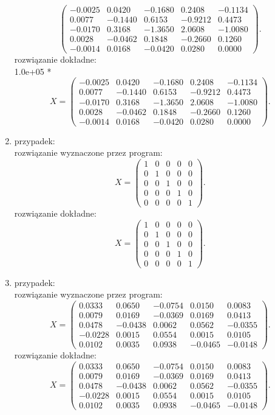 \documentclass[12pt]{article}
\begin{document}
\begin{enumerate}
\[\begin{pmatrix}
-0.0025 & 0.0420 & -0.1680 & 0.2408 & -0.1134 \\
0.0077 & -0.1440 & 0.6153 & -0.9212 & 0.4473 \\
-0.0170 & 0.3168 & -1.3650 & 2.0608 & -1.0080 \\
0.0028 & -0.0462 & 0.1848 & -0.2660 & 0.1260 \\
-0.0014 & 0.0168 & -0.0420 & 0.0280 & 0.0000
\end{pmatrix}.
\]
rozwi\k{a}zanie dok\l{}adne:
\\ 1.0e+05 *
\[ 
X=\begin{pmatrix}
-0.0025 & 0.0420 & -0.1680 & 0.2408 & -0.1134 \\
0.0077 & -0.1440 & 0.6153 & -0.9212 & 0.4473 \\
-0.0170 & 0.3168 & -1.3650 & 2.0608 & -1.0080 \\
0.0028 & -0.0462 & 0.1848 & -0.2660 & 0.1260 \\
-0.0014 & 0.0168 & -0.0420 & 0.0280 & 0.0000
\end{pmatrix}.
\]
\item przypadek:
\\
rozwi\k{a}zanie wyznaczone przez program:
\[
X=\begin{pmatrix}
1 & 0 & 0 & 0 & 0 \\
0 & 1 & 0 & 0 & 0 \\
0 & 0 & 1 & 0 & 0 \\
0 & 0 & 0 & 1 & 0 \\
0 & 0 & 0 & 0 & 1
\end{pmatrix}.
\]
rozwi\k{a}zanie dok\l{}adne:
\[
X=\begin{pmatrix}
1 & 0 & 0 & 0 & 0 \\
0 & 1 & 0 & 0 & 0 \\
0 & 0 & 1 & 0 & 0 \\
0 & 0 & 0 & 1 & 0 \\
0 & 0 & 0 & 0 & 1
\end{pmatrix}.
\]
\item przypadek:
\\
rozwi\k{a}zanie wyznaczone przez program:
\[
X=\begin{pmatrix}
0.0333 & 0.0650 & -0.0754 & 0.0150 & 0.0083 \\
0.0079 & 0.0169 & -0.0369 & 0.0169 & 0.0413 \\
0.0478 & -0.0438 & 0.0062 & 0.0562 & -0.0355 \\
-0.0228 & 0.0015 & 0.0554 & 0.0015 & 0.0105 \\
0.0102 & 0.0035 & 0.0938 & -0.0465 & -0.0148
\end{pmatrix}.
\]
rozwi\k{a}zanie dok\l{}adne:
\[
X=\begin{pmatrix}
0.0333 & 0.0650 & -0.0754 & 0.0150 & 0.0083 \\
0.0079 & 0.0169 & -0.0369 & 0.0169 & 0.0413 \\
0.0478 & -0.0438 & 0.0062 & 0.0562 & -0.0355 \\
-0.0228 & 0.0015 & 0.0554 & 0.0015 & 0.0105 \\
0.0102 & 0.0035 & 0.0938 & -0.0465 & -0.0148
\end{pmatrix}.
\]

\end{enumerate}
\end{document}
